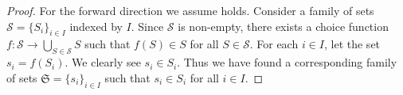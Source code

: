 \begin{questions}
    \item \begin{proof}
        For the forward direction we assume  holds. Consider a family of sets $\mathcal{S} = \{S_i\}_{i \in I}$ indexed by $I$. Since $\mathcal{S}$ is non-empty, there exists a choice function $f: \mathcal{S} \to \bigcup_{S \in \mathcal{S}} S$ such that $f(S) \in S$ for all $S \in \mathcal{S}$. For each $i \in I$, let the set $s_i = f(S_i)$. We clearly see $s_i \in S_i$. Thus we have found a corresponding family of sets $\mathfrak{S} = \{s_i\}_{i\in I}$ such that $s_i \in S_i$ for all $i \in I$.
    \end{proof}
\end{questions}